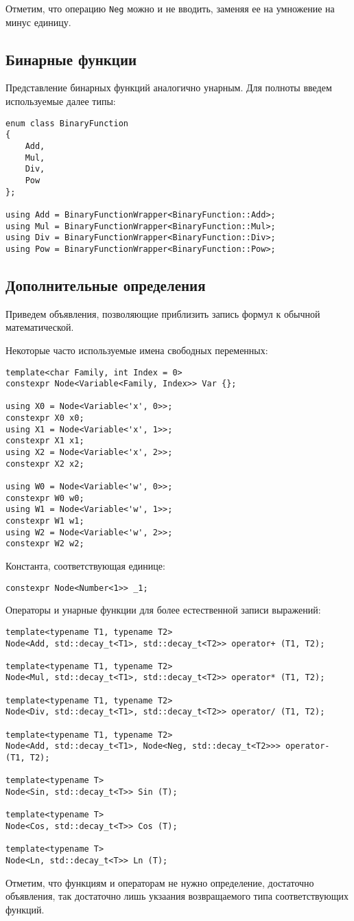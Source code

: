\documentclass[11pt,a4paper]{article}
\begin{document}
Отметим, что операцию \texttt{Neg} можно и не вводить, заменяя ее на умножение на
минус единицу.

\subsection{Бинарные функции}

Представление бинарных функций аналогично унарным. Для полноты введем используемые далее
типы:
\begin{lstlisting}
enum class BinaryFunction
{
	Add,
	Mul,
	Div,
	Pow
};

using Add = BinaryFunctionWrapper<BinaryFunction::Add>;
using Mul = BinaryFunctionWrapper<BinaryFunction::Mul>;
using Div = BinaryFunctionWrapper<BinaryFunction::Div>;
using Pow = BinaryFunctionWrapper<BinaryFunction::Pow>;
\end{lstlisting}

\subsection{Дополнительные определения}

Приведем объявления, позволяющие приблизить запись формул к обычной математической.

Некоторые часто используемые имена свободных переменных:
\begin{lstlisting}
template<char Family, int Index = 0>
constexpr Node<Variable<Family, Index>> Var {};

using X0 = Node<Variable<'x', 0>>;
constexpr X0 x0;
using X1 = Node<Variable<'x', 1>>;
constexpr X1 x1;
using X2 = Node<Variable<'x', 2>>;
constexpr X2 x2;

using W0 = Node<Variable<'w', 0>>;
constexpr W0 w0;
using W1 = Node<Variable<'w', 1>>;
constexpr W1 w1;
using W2 = Node<Variable<'w', 2>>;
constexpr W2 w2;
\end{lstlisting}

Константа, соответствующая единице:
\begin{lstlisting}
constexpr Node<Number<1>> _1;
\end{lstlisting}

Операторы и унарные функции для более естественной записи выражений:
\begin{lstlisting}
template<typename T1, typename T2>
Node<Add, std::decay_t<T1>, std::decay_t<T2>> operator+ (T1, T2);

template<typename T1, typename T2>
Node<Mul, std::decay_t<T1>, std::decay_t<T2>> operator* (T1, T2);

template<typename T1, typename T2>
Node<Div, std::decay_t<T1>, std::decay_t<T2>> operator/ (T1, T2);

template<typename T1, typename T2>
Node<Add, std::decay_t<T1>, Node<Neg, std::decay_t<T2>>> operator- (T1, T2);

template<typename T>
Node<Sin, std::decay_t<T>> Sin (T);

template<typename T>
Node<Cos, std::decay_t<T>> Cos (T);

template<typename T>
Node<Ln, std::decay_t<T>> Ln (T);
\end{lstlisting}

Отметим, что функциям и операторам не нужно определение, достаточно объявления, так
достаточно лишь укзаания возвращаемого типа соответствующих функций.
\end{document}
